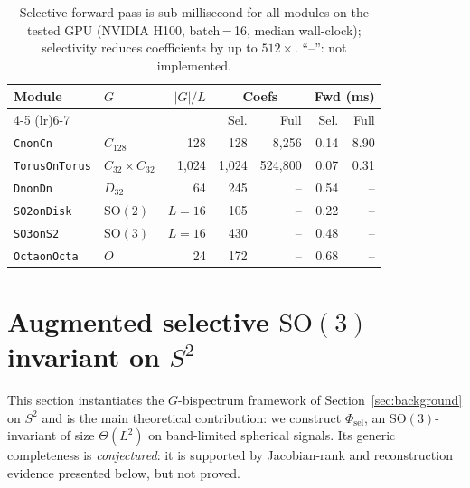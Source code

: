 \documentclass{article}
\theoremstyle{definition}
\theoremstyle{remark}
\newcommand{\SO}{\mathrm{SO}}
\theoremstyle{definition}
\begin{document}
\begin{table}[tbp]
  \centering
  \caption{Selective forward pass is sub-millisecond for all modules
    on the tested GPU (NVIDIA H100, batch\,=\,16, median wall-clock);
    selectivity reduces coefficients by up to $512\times$.
    ``--'': not implemented.}
  \label{tab:benchmarks}
  \small
  \setlength{\tabcolsep}{3.5pt}
  \begin{tabular*}{\linewidth}{@{\extracolsep{\fill}}llrrrrr@{}}
    \toprule
    Module & $G$ & $|G|/L$ & \multicolumn{2}{c}{Coefs} & \multicolumn{2}{c}{Fwd (ms)} \\
    \cmidrule(lr){4-5} \cmidrule(lr){6-7}
     & & & Sel. & Full & Sel. & Full \\
    \midrule
    \texttt{CnonCn} & $C_{128}$ & 128 & 128 & 8{,}256 & 0.14 & 8.90 \\
    \texttt{TorusOnTorus} & $C_{32}{\times}C_{32}$ & 1{,}024 & 1{,}024 & 524{,}800 & 0.07 & 0.31 \\
    \texttt{DnonDn} & $D_{32}$ & 64 & 245 & -- & 0.54 & -- \\
    \texttt{SO2onDisk} & $\mathrm{SO}(2)$ & $L{=}16$ & 105 & -- & 0.22 & -- \\
    \texttt{SO3onS2} & $\mathrm{SO}(3)$ & $L{=}16$ & 430 & -- & 0.48 & -- \\
    \texttt{OctaonOcta} & $O$ & 24 & 172 & -- & 0.68 & -- \\
    \bottomrule
  \end{tabular*}
\end{table}



\section{Augmented selective $\SO(3)$ invariant on $S^2$}
\label{sec:so3-selective}

This section instantiates the $G$-bispectrum framework of
Section~\ref{sec:background} on $S^2$ and is the main theoretical
contribution: we construct $\Phi_{\mathrm{sel}}$, an
$\SO(3)$-invariant of size $\Theta(L^2)$ on band-limited spherical
signals. Its generic completeness is \emph{conjectured}: it is
supported by Jacobian-rank and reconstruction evidence presented
below, but not proved.
\end{document}
